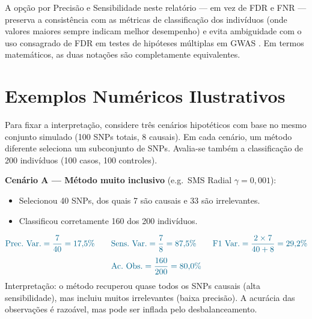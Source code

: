 \documentclass[
    12pt,
    a4paper,
    oneside,
    english,
    french,
    spanish,
    brazil
    ]{abntex2}
\newcommand{\novo}[1]{\textcolor{corNova}{#1}}
\begin{document}
\novo{A opção por Precisão e Sensibilidade neste relatório --- em vez de FDR e FNR --- preserva a consistência com as métricas de classificação dos indivíduos (onde valores maiores sempre indicam melhor desempenho) e evita ambiguidade com o uso consagrado de FDR em testes de hipóteses múltiplas em GWAS \cite{benjamini1995controlling}. Em termos matemáticos, as duas notações são completamente equivalentes.}

\section*{Exemplos Numéricos Ilustrativos}

\novo{Para fixar a interpretação, considere três cenários hipotéticos com base no mesmo conjunto simulado (100 SNPs totais, 8 causais). Em cada cenário, um método diferente seleciona um subconjunto de SNPs. Avalia-se também a classificação de 200 indivíduos (100 casos, 100 controles).}

\medskip
\noindent\novo{\textbf{Cenário A --- Método muito inclusivo} (e.g.\ SMS Radial $\gamma = 0{,}001$):}
\begin{itemize}
  \item \novo{Selecionou 40 SNPs, dos quais 7 são causais e 33 são irrelevantes.}
  \item \novo{Classificou corretamente 160 dos 200 indivíduos.}
\end{itemize}
\begin{equation}
  \novo{\text{Prec.\ Var.} = \frac{7}{40} = 17{,}5\% \qquad
   \text{Sens.\ Var.} = \frac{7}{8} = 87{,}5\% \qquad
   \text{F1\ Var.} = \frac{2\times7}{40+8} = 29{,}2\%}
  \label{eq:metricas-a}
\end{equation}
\begin{equation}
  \novo{\text{Ac.\ Obs.} = \frac{160}{200} = 80{,}0\%}
  \label{eq:acobs-a}
\end{equation}
\novo{Interpretação: o método recuperou quase todos os SNPs causais (alta sensibilidade), mas incluiu muitos irrelevantes (baixa precisão). A acurácia das observações é razoável, mas pode ser inflada pelo desbalanceamento.}
\end{document}
